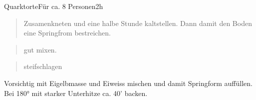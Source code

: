 \documentclass[
  a4paper,
]{article}
\begin{document}
\begin{recipe}{Quarktorte}{Für ca. 8 Personen}{2h}


\begin{quote}
Zusamenkneten und eine halbe Stunde kaltstellen. Dann damit den Boden
eine Springfrom bestreichen.
\end{quote}

\freeform\hrulefill


\begin{quote}
gut mixen.
\end{quote}

\freeform\hrulefill


\begin{quote}
steifschlagen
\end{quote}

\freeform\hrulefill


Vorsichtig mit Eigelbmasse und Eiweiss mischen und damit Springform
auffüllen. Bei 180° mit starker Unterhitze ca. 40' backen.

\freeform\hrulefill\newline\freeform{}\end{recipe}

\newpage
\end{document}
